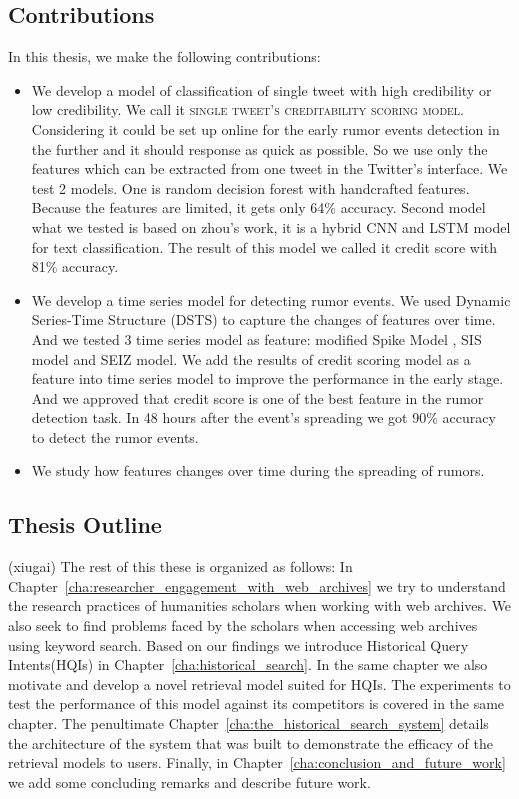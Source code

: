  \newpage
 \subsection{Contributions}
In this thesis, we make the following contributions:

\begin{itemize}
	
	\item We develop a model of classification of single tweet with high credibility or low credibility. We call it \textsc{single tweet's creditability scoring model}. Considering it could be set up online for the early rumor events detection in the further and it should response as quick as possible. So we use only the features which can be extracted from one tweet in the Twitter's interface. We test 2 models. One is random decision forest with handcrafted features. Because the features are limited, it gets only 64\% accuracy. Second model what we tested is based on zhou's\cite{zhou2015c} work, it is a hybrid CNN and LSTM model for text classification. The result of this model we called it credit score with 81\% accuracy.

 	\item We develop a time series model for detecting rumor events. We used Dynamic Series-Time Structure (DSTS)\cite{liu2015real} to capture the changes of features over time. And we tested 3 time series model as feature: modified Spike Model \cite{kwon2013prominent}, SIS model and SEIZ model\cite{jin2013epidemiological}. We add the results of credit scoring model as a feature into time series model to improve the performance in the early stage. And we approved that credit score is one of the best feature in the rumor detection task. In 48 hours after the event's spreading we got 90\% accuracy to detect the rumor events. 

 	\item We study how features changes over time during the spreading of rumors.

 \end{itemize}
 
 
\subsection{Thesis Outline}

(xiugai)
The rest of this these is organized as follows: In Chapter~\ref{cha:researcher_engagement_with_web_archives} we try to understand the research practices of humanities scholars when working with web archives. We also seek to find problems faced by the scholars when accessing web archives using keyword search. Based on our findings we introduce Historical Query Intents(HQIs) in Chapter~\ref{cha:historical_search}. In the same chapter we also motivate and develop a novel retrieval model suited for HQIs. The experiments to test the performance of this model against its competitors is covered in the same chapter. The penultimate Chapter~\ref{cha:the_historical_search_system} details the architecture of the system that was built to demonstrate the efficacy of the retrieval models to users. Finally, in Chapter~\ref{cha:conclusion_and_future_work} we add some concluding remarks and describe future work.

